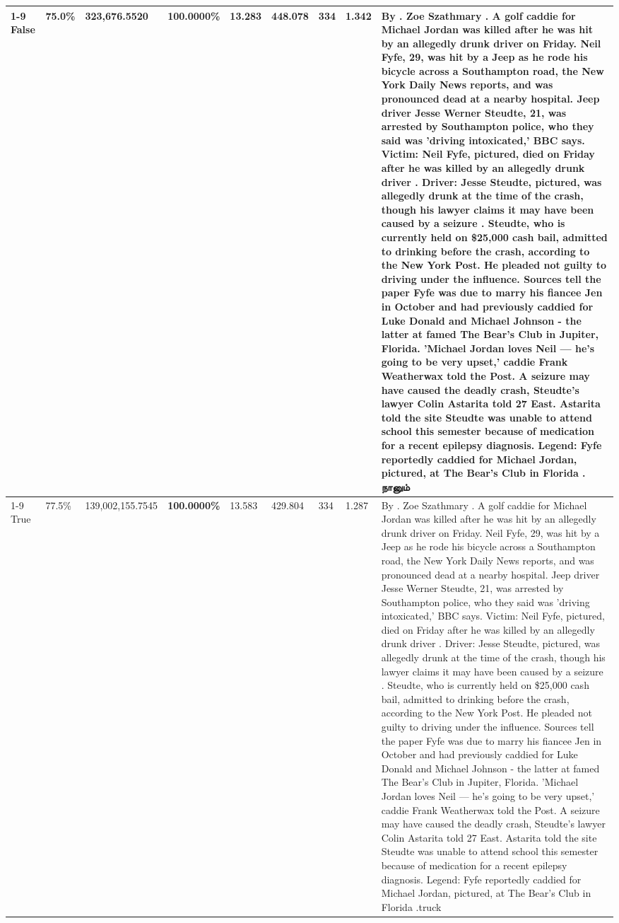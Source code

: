 \begin{table}[H]
\begin{tabular}{lllrlllll}
\cline{1-9}
False & 75.0\% & 323,676.5520 & \bfseries \color{red} 100.0000\% & 13.283 & 448.078 & 334 & 1.342 & By . Zoe Szathmary . A golf caddie for Michael Jordan was killed after he was hit by an allegedly drunk driver on Friday. Neil Fyfe, 29, was hit by a Jeep as he rode his bicycle across a Southampton road, the New York Daily News reports, and was pronounced dead at a nearby hospital. Jeep driver Jesse Werner Steudte, 21, was arrested by Southampton police, who they said was 'driving intoxicated,' BBC says. Victim: Neil Fyfe, pictured, died on Friday after he was killed by an allegedly drunk driver . Driver: Jesse Steudte, pictured, was allegedly drunk at the time of the crash, though his lawyer claims it may have been caused by a seizure . Steudte, who is currently held on \$25,000 cash bail, admitted to drinking before the crash, according to the New York Post. He pleaded not guilty to driving under the influence. Sources tell the paper Fyfe was due to marry his fiancee Jen in October and had previously caddied for Luke Donald and Michael Johnson - the latter at famed The Bear's Club in Jupiter, Florida. 'Michael Jordan loves Neil — he’s going to be very upset,' caddie Frank Weatherwax told the Post. A seizure may have caused the deadly crash, Steudte's lawyer Colin Astarita told 27 East. Astarita told the site Steudte was unable to attend school this semester because of medication for a recent epilepsy diagnosis. Legend: Fyfe reportedly caddied for Michael Jordan, pictured, at The Bear's Club in Florida . நானும் \\
\cline{1-9}
True & 77.5\% & 139,002,155.7545 & \bfseries \color{red} 100.0000\% & 13.583 & 429.804 & 334 & 1.287 & By . Zoe Szathmary . A golf caddie for Michael Jordan was killed after he was hit by an allegedly drunk driver on Friday. Neil Fyfe, 29, was hit by a Jeep as he rode his bicycle across a Southampton road, the New York Daily News reports, and was pronounced dead at a nearby hospital. Jeep driver Jesse Werner Steudte, 21, was arrested by Southampton police, who they said was 'driving intoxicated,' BBC says. Victim: Neil Fyfe, pictured, died on Friday after he was killed by an allegedly drunk driver . Driver: Jesse Steudte, pictured, was allegedly drunk at the time of the crash, though his lawyer claims it may have been caused by a seizure . Steudte, who is currently held on \$25,000 cash bail, admitted to drinking before the crash, according to the New York Post. He pleaded not guilty to driving under the influence. Sources tell the paper Fyfe was due to marry his fiancee Jen in October and had previously caddied for Luke Donald and Michael Johnson - the latter at famed The Bear's Club in Jupiter, Florida. 'Michael Jordan loves Neil — he’s going to be very upset,' caddie Frank Weatherwax told the Post. A seizure may have caused the deadly crash, Steudte's lawyer Colin Astarita told 27 East. Astarita told the site Steudte was unable to attend school this semester because of medication for a recent epilepsy diagnosis. Legend: Fyfe reportedly caddied for Michael Jordan, pictured, at The Bear's Club in Florida .truck \\

\end{tabular}
\end{table}
